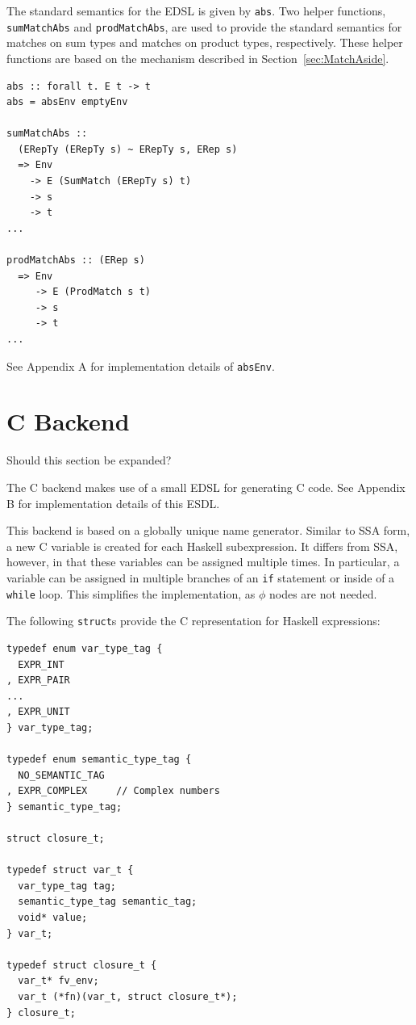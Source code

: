 \documentclass[sigplan,anonymous,review]{acmart}
\newcommand{\ttt}{\texttt}
\newenvironment{todont}
               {\comment}
               {\endcomment}
\begin{document}
The standard semantics for the EDSL is given by \ttt{abs}. Two helper
functions, \ttt{sumMatchAbs} and \ttt{prodMatchAbs}, are used to provide
the standard semantics for matches on sum types and matches on product
types, respectively. These helper functions are based on the mechanism
described in Section~\ref{sec:MatchAside}.

\begin{lstlisting}
abs :: forall t. E t -> t
abs = absEnv emptyEnv

sumMatchAbs ::
  (ERepTy (ERepTy s) ~ ERepTy s, ERep s)
  => Env
    -> E (SumMatch (ERepTy s) t)
    -> s
    -> t
...

prodMatchAbs :: (ERep s)
  => Env
     -> E (ProdMatch s t)
     -> s
     -> t
...
\end{lstlisting}

See Appendix A for implementation details of \ttt{absEnv}.


\newpage
\section{C Backend}
\label{sec:CBackend}

\begin{todont}
  Should this section be expanded?
\end{todont}

The C backend makes use of a small EDSL for generating C code. See
Appendix B for implementation details of this ESDL.

This backend is based on a globally unique name generator. Similar to
SSA form, a new C variable is created for each Haskell subexpression.
It differs from SSA, however, in that these variables can be assigned multiple
times. In particular, a variable can be assigned in multiple branches of
an \ttt{if} statement or inside of a \ttt{while} loop. This simplifies
the implementation, as $\phi$ nodes are not needed.

The following \ttt{struct}s provide the C representation for Haskell expressions:

\begin{lstlisting}
typedef enum var_type_tag {
  EXPR_INT
, EXPR_PAIR
...
, EXPR_UNIT
} var_type_tag;

typedef enum semantic_type_tag {
  NO_SEMANTIC_TAG
, EXPR_COMPLEX     // Complex numbers
} semantic_type_tag;

struct closure_t;

typedef struct var_t {
  var_type_tag tag;
  semantic_type_tag semantic_tag;
  void* value;
} var_t;

typedef struct closure_t {
  var_t* fv_env;
  var_t (*fn)(var_t, struct closure_t*);
} closure_t;
\end{lstlisting}
\end{document}
